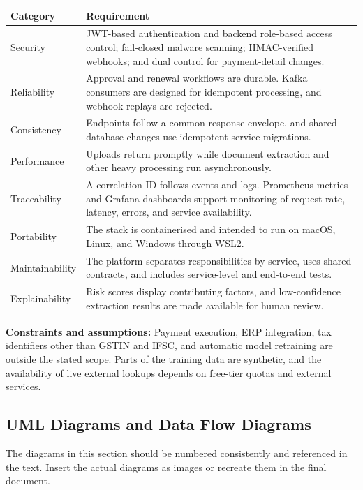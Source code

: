\documentclass[12pt,a4paper]{report}
\begin{document}
\begin{longtable}{|p{1.5in}|p{4.8in}|}
\hline
\textbf{Category} & \textbf{Requirement} \\
\hline
Security & JWT-based authentication and backend role-based access
control; fail-closed malware scanning; HMAC-verified webhooks; and
dual control for payment-detail changes. \\
\hline
Reliability & Approval and renewal workflows are durable. Kafka
consumers are designed for idempotent processing, and webhook replays
are rejected. \\
\hline
Consistency & Endpoints follow a common response envelope, and shared
database changes use idempotent service migrations. \\
\hline
Performance & Uploads return promptly while document extraction and other
heavy processing run asynchronously. \\
\hline
Traceability & A correlation ID follows events and logs. Prometheus
metrics and Grafana dashboards support monitoring of request rate,
latency, errors, and service availability. \\
\hline
Portability & The stack is containerised and intended to run on macOS,
Linux, and Windows through WSL2. \\
\hline
Maintainability & The platform separates responsibilities by service,
uses shared contracts, and includes service-level and end-to-end tests. \\
\hline
Explainability & Risk scores display contributing factors, and
low-confidence extraction results are made available for human review. \\
\hline
\end{longtable}

\textbf{Constraints and assumptions:} Payment execution, ERP
integration, tax identifiers other than GSTIN and IFSC, and automatic
model retraining are outside the stated scope. Parts of the training
data are synthetic, and the availability of live external lookups
depends on free-tier quotas and external services.

\subsection{UML Diagrams and Data Flow Diagrams}

The diagrams in this section should be numbered consistently and
referenced in the text. Insert the actual diagrams as images or
recreate them in the final document.
\end{document}
